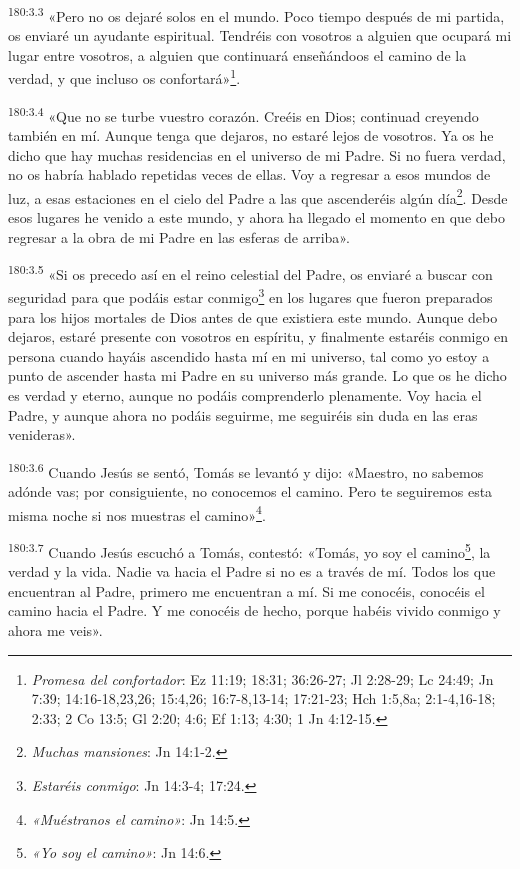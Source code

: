 \par
\textsuperscript{180:3.3} «Pero no os dejaré solos en el mundo. Poco tiempo después de mi partida, os enviaré un ayudante espiritual. Tendréis con vosotros a alguien que ocupará mi lugar entre vosotros, a alguien que continuará enseñándoos el camino de la verdad, y que incluso os confortará»\footnote{\textit{Promesa del confortador}: Ez 11:19; 18:31; 36:26-27; Jl 2:28-29; Lc 24:49; Jn 7:39; 14:16-18,23,26; 15:4,26; 16:7-8,13-14; 17:21-23; Hch 1:5,8a; 2:1-4,16-18; 2:33; 2 Co 13:5; Gl 2:20; 4:6; Ef 1:13; 4:30; 1 Jn 4:12-15.}.

\par
\textsuperscript{180:3.4} «Que no se turbe vuestro corazón. Creéis en Dios; continuad creyendo también en mí. Aunque tenga que dejaros, no estaré lejos de vosotros. Ya os he dicho que hay muchas residencias en el universo de mi Padre. Si no fuera verdad, no os habría hablado repetidas veces de ellas. Voy a regresar a esos mundos de luz, a esas estaciones en el cielo del Padre a las que ascenderéis algún día\footnote{\textit{Muchas mansiones}: Jn 14:1-2.}. Desde esos lugares he venido a este mundo, y ahora ha llegado el momento en que debo regresar a la obra de mi Padre en las esferas de arriba».

\par
\textsuperscript{180:3.5} «Si os precedo así en el reino celestial del Padre, os enviaré a buscar con seguridad para que podáis estar conmigo\footnote{\textit{Estaréis conmigo}: Jn 14:3-4; 17:24.} en los lugares que fueron preparados para los hijos mortales de Dios antes de que existiera este mundo. Aunque debo dejaros, estaré presente con vosotros en espíritu, y finalmente estaréis conmigo en persona cuando hayáis ascendido hasta mí en mi universo, tal como yo estoy a punto de ascender hasta mi Padre en su universo más grande. Lo que os he dicho es verdad y eterno, aunque no podáis comprenderlo plenamente. Voy hacia el Padre, y aunque ahora no podáis seguirme, me seguiréis sin duda en las eras venideras».

\par
\textsuperscript{180:3.6} Cuando Jesús se sentó, Tomás se levantó y dijo: «Maestro, no sabemos adónde vas; por consiguiente, no conocemos el camino. Pero te seguiremos esta misma noche si nos muestras el camino»\footnote{\textit{«Muéstranos el camino»}: Jn 14:5.}.

\par
\textsuperscript{180:3.7} Cuando Jesús escuchó a Tomás, contestó: «Tomás, yo soy el camino\footnote{\textit{«Yo soy el camino»}: Jn 14:6.}, la verdad y la vida. Nadie va hacia el Padre si no es a través de mí. Todos los que encuentran al Padre, primero me encuentran a mí. Si me conocéis, conocéis el camino hacia el Padre. Y me conocéis de hecho, porque habéis vivido conmigo y ahora me veis».


